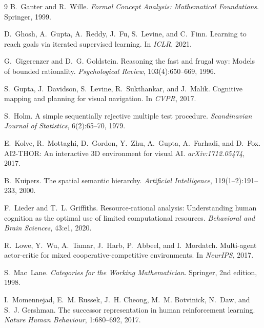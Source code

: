 \documentclass{article}
\begin{document}
{\begin{thebibliography}{9}
B.~Ganter and R.~Wille.
\newblock \emph{Formal Concept Analysis: Mathematical Foundations}.
\newblock Springer, 1999.

D.~Ghosh, A.~Gupta, A.~Reddy, J.~Fu, S.~Levine, and C.~Finn.
\newblock Learning to reach goals via iterated supervised learning.
\newblock In \emph{ICLR}, 2021.

G.~Gigerenzer and D.~G. Goldstein.
\newblock Reasoning the fast and frugal way: Models of bounded rationality.
\newblock \emph{Psychological Review}, 103(4):650--669, 1996.

S.~Gupta, J.~Davidson, S.~Levine, R.~Sukthankar, and J.~Malik.
\newblock Cognitive mapping and planning for visual navigation.
\newblock In \emph{CVPR}, 2017.

S.~Holm.
\newblock A simple sequentially rejective multiple test procedure.
\newblock \emph{Scandinavian Journal of Statistics}, 6(2):65--70, 1979.

E.~Kolve, R.~Mottaghi, D.~Gordon, Y.~Zhu, A.~Gupta, A.~Farhadi, and D.~Fox.
\newblock AI2-THOR: An interactive 3D environment for visual AI.
\newblock \emph{arXiv:1712.05474}, 2017.

B.~Kuipers.
\newblock The spatial semantic hierarchy.
\newblock \emph{Artificial Intelligence}, 119(1--2):191--233, 2000.

F.~Lieder and T.~L. Griffiths.
\newblock Resource-rational analysis: Understanding human cognition as the optimal use of limited computational resources.
\newblock \emph{Behavioral and Brain Sciences}, 43:e1, 2020.

R.~Lowe, Y.~Wu, A.~Tamar, J.~Harb, P.~Abbeel, and I.~Mordatch.
\newblock Multi-agent actor-critic for mixed cooperative-competitive environments.
\newblock In \emph{NeurIPS}, 2017.

S.~Mac~Lane.
\newblock \emph{Categories for the Working Mathematician}.
\newblock Springer, 2nd edition, 1998.

I.~Momennejad, E.~M. Russek, J.~H. Cheong, M.~M. Botvinick, N.~Daw, and S.~J. Gershman.
\newblock The successor representation in human reinforcement learning.
\newblock \emph{Nature Human Behaviour}, 1:680--692, 2017.


\end{thebibliography}}
\end{document}
